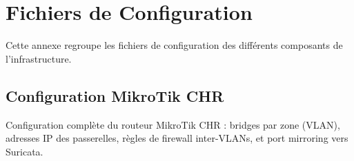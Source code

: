 ﻿\chapter{Fichiers de Configuration}
\label{annexe:configs}

Cette annexe regroupe les fichiers de configuration des différents composants de l'infrastructure.

\section{Configuration MikroTik CHR}
\label{sec:config_mikrotik}

Configuration complète du routeur MikroTik CHR : bridges par zone (VLAN), adresses IP des passerelles, règles de firewall inter-VLANs, et port mirroring vers Suricata.

